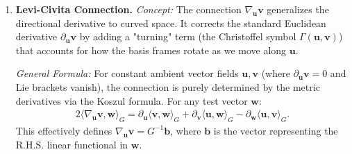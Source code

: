 \begin{enumerate}
    \emph{Decomposition:} 
    The vertical volume density is constant, so $\nabla_\theta \log \det G_V = 0$. The density correction comes purely from the horizontal component.
    \begin{align}
        \Delta f = \underbrace{\text{Tr}\big( \nabla_\theta (\nabla^G f) \big)}_{\text{Total Trace}} + \frac{1}{2} \underbrace{(\nabla^G f)_H^\top \nabla_\theta \big( \textsf{LogDet}_H(\theta) \big)}_{\text{Horizontal Density Correction}}.
    \end{align}
    
    \emph{Approximation \& Primitives:} 
    \textbf{Trace Term:} We estimate the trace using Hutchinson's estimator. We sample $\mathbf{z} \sim \mathcal{N}(0, I)$ and compute the directional derivative of the Riemannian gradient along $\mathbf{z}$.
    \begin{align}
        \text{Tr}\big( \nabla_\theta (\nabla^G f) \big) \approx \mathbb{E}_{\mathbf{z}} \left[ \mathbf{z}^\top \left( \partial_{\mathbf{z}} \big( \nabla^G f(\theta) \big) \right) \right].
    \end{align}
    Crucially, $\nabla^G f(\theta)$ is itself computed via our primitives (Item 2). The term $\partial_{\mathbf{z}} (\nabla^G f)$ is computed by AD differentiation \emph{through} the linear solve (\textbf{Primitive 2}) and projection (\textbf{Primitive 1}).
    
    \textbf{Density Term:} computed by differentiating \textbf{Primitive 3} (LogDet) and taking the dot product with the horizontal Riemannian gradient.

    \item \textbf{Levi-Civita Connection.}
    \emph{Concept:} 
    The connection $\nabla_{\mathbf{u}} \mathbf{v}$ generalizes the directional derivative to curved space. It corrects the standard Euclidean derivative $\partial_{\mathbf{u}} \mathbf{v}$ by adding a "turning" term (the Christoffel symbol $\Gamma(\mathbf{u}, \mathbf{v})$) that accounts for how the basis frames rotate as we move along $\mathbf{u}$.
    
    \emph{General Formula:} 
    For constant ambient vector fields $\mathbf{u}, \mathbf{v}$ (where $\partial_{\mathbf{u}}\mathbf{v} = 0$ and Lie brackets vanish), the connection is purely determined by the metric derivatives via the Koszul formula. For any test vector $\mathbf{w}$:
    \begin{align}
        2 \langle \nabla_{\mathbf{u}} \mathbf{v}, \mathbf{w} \rangle_G = \partial_{\mathbf{u}} \langle \mathbf{v}, \mathbf{w} \rangle_G + \partial_{\mathbf{v}} \langle \mathbf{u}, \mathbf{w} \rangle_G - \partial_{\mathbf{w}} \langle \mathbf{u}, \mathbf{v} \rangle_G.
    \end{align}
    This effectively defines $\nabla_{\mathbf{u}} \mathbf{v} = G^{-1} \mathbf{b}$, where $\mathbf{b}$ is the vector representing the R.H.S. linear functional in $\mathbf{w}$.
    

\end{enumerate}
